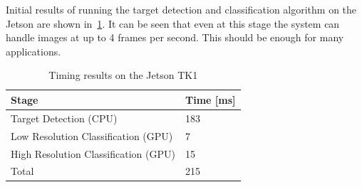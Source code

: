 \documentclass[a4paper]{article} %
\begin{document}
Initial results of running the target detection and classification algorithm on
the Jetson are shown in~\cref{tb:jetson1}. It can be seen that even at this
stage the system can handle images at up to 4 frames per second. This should be
enough for many applications.
\begin{table}
	\centering
	\begin{tabular}{ | l | l | }
		\hline
		Stage                                & Time [ms] \\ \hline
		Target Detection (CPU)               & 183       \\ \hline
		Low Resolution Classification (GPU)  & 7         \\ \hline
		High Resolution Classification (GPU) & 15        \\ \hline
		Total                                & 215       \\ \hline
	\end{tabular}
	\caption{Timing results on the Jetson TK1}
	\label{tb:jetson1}
\end{table}
\end{document}
